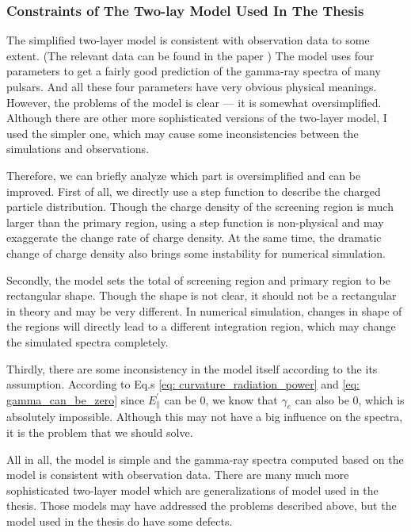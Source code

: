 \documentclass[12pt]{report}
\begin{document}
      \subsubsection{Constraints of The Two-lay Model Used In The Thesis} 
        The simplified two-layer model is consistent with observation data to some extent. 
        (The relevant data can be found in the paper \cite{0004-637X-720-1-178})
        The model uses four parameters to get a fairly good prediction of the gamma-ray spectra 
        of many pulsars. And all these four parameters have very obvious physical meanings. 
        However, the problems of the model is clear --- it is somewhat oversimplified. 
        Although there are other more sophisticated versions of the two-layer model, I used the simpler one, 
        which may cause some inconsistencies between the simulations and observations. 

        Therefore, we can briefly analyze which part is oversimplified and can be improved. 
        First of all, we directly use a step function to describe the charged particle distribution. 
        Though the charge density of the screening region is much larger than the primary region, using 
        a step function is non-physical and may exaggerate the change rate of charge density. At the 
        same time, the dramatic change of charge density also brings some instability for 
        numerical simulation. 

        Secondly, the model sets the total of screening region and primary region to be rectangular shape. 
        Though the shape is not clear, it should not be a rectangular in theory and may be very different.
        In numerical simulation, changes in shape of the regions will directly lead to a different 
        integration region, which may change the simulated spectra completely.

        Thirdly, there are some inconsistency in the model itself according to the its assumption. 
        According to Eq.s \ref{eq: curvature_radiation_power} and \ref{eq: gamma_can_be_zero}
        since $E_{\parallel}^{\prime}$ can be $0$, we know that 
        $\gamma_{e}$ can also be $0$, which is absolutely impossible. Although this may not have a big 
        influence on the spectra, it is the problem that we should solve. 

        All in all, the model is simple and the gamma-ray spectra computed based on the model is 
        consistent with observation data. There are many much more sophisticated two-layer model 
        which are generalizations of model used in the thesis. Those models may have addressed the 
        problems described above, but the model used in the thesis do have some defects. 
\end{document}
